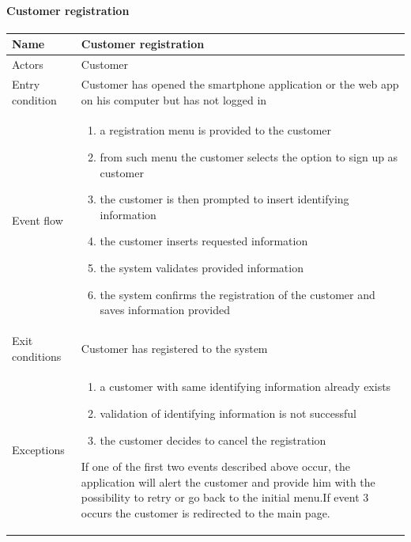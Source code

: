 \paragraph{Customer registration}
\begin{flushleft}
	\begin{tabular} { | m{3cm} | m{10cm} | }
		\hline
		Name & Customer registration\\
		\hline
		Actors & Customer\\
		\hline
		Entry condition & Customer has opened the smartphone application or the web app on his computer but has not logged in\\
		\hline
		Event flow & \begin{enumerate}
			\item a registration menu is provided to the customer
			\item from such menu the customer selects the option to sign up as customer
			\item the customer is then prompted to insert identifying information
			\item the customer inserts requested information
			\item the system validates provided information
			\item the system confirms the registration of the customer and saves information provided
		\end{enumerate}\\
		\hline
		Exit conditions & Customer has registered to the system\\
		\hline
		Exceptions & \begin{enumerate}
			\item a customer with same identifying information already exists
			\item validation of identifying information is not successful
			\item the customer decides to cancel the registration
		\end{enumerate}
		If one of the first two events described above occur, the application will alert the customer and provide him with the possibility to retry or go back to the initial menu.\newline If event 3 occurs the customer is redirected to the main page.\\
		\hline
	\end{tabular}
\end{flushleft}
\newpage
